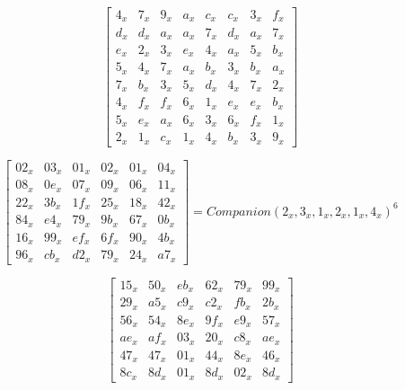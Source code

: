 \begin{equation}\label{mat:photon_a256-inv}
  \begin{bmatrix}
  4_x & 7_x & 9_x & a_x & c_x & c_x & 3_x & f_x\\
  d_x & d_x & a_x & a_x & 7_x & d_x & a_x & 7_x\\
  e_x & 2_x & 3_x & e_x & 4_x & a_x & 5_x & b_x\\
  5_x & 4_x & 7_x & a_x & b_x & 3_x & b_x & a_x\\
  7_x & b_x & 3_x & 5_x & d_x & 4_x & 7_x & 2_x\\
  4_x & f_x & f_x & 6_x & 1_x & e_x & e_x & b_x\\
  5_x & e_x & a_x & 6_x & 3_x & 6_x & f_x & 1_x\\
  2_x & 1_x & c_x & 1_x & 4_x & b_x & 3_x & 9_x
  \end{bmatrix}
\end{equation}

\begin{equation}\label{mat:photon_a288}
  \begin{bmatrix}
  02_x & 03_x & 01_x & 02_x & 01_x & 04_x\\
  08_x & 0e_x & 07_x & 09_x & 06_x & 11_x\\
  22_x & 3b_x & 1f_x & 25_x & 18_x & 42_x\\
  84_x & e4_x & 79_x & 9b_x & 67_x & 0b_x\\
  16_x & 99_x & ef_x & 6f_x & 90_x & 4b_x\\
  96_x & cb_x & d2_x & 79_x & 24_x & a7_x
  \end{bmatrix}
  =
  Companion(2_x,3_x,1_x,2_x,1_x,4_x)^6
\end{equation}

\begin{equation}\label{mat:photon_a288-inv}
  \begin{bmatrix}
  15_x & 50_x & eb_x & 62_x & 79_x & 99_x\\
  29_x & a5_x & c9_x & c2_x & fb_x & 2b_x\\
  56_x & 54_x & 8e_x & 9f_x & e9_x & 57_x\\
  ae_x & af_x & 03_x & 20_x & c8_x & ae_x\\
  47_x & 47_x & 01_x & 44_x & 8e_x & 46_x\\
  8c_x & 8d_x & 01_x & 8d_x & 02_x & 8d_x
  \end{bmatrix}
\end{equation}
